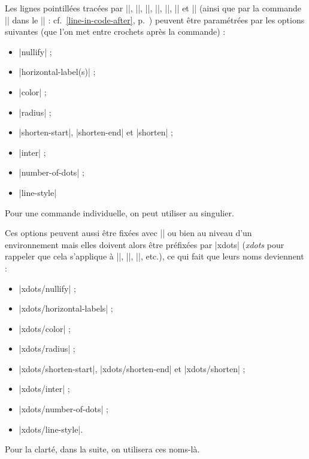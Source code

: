 \documentclass[dvipsnames]{article}
\begin{document}
\label{customization}


Les lignes pointillées tracées par |\Ldots|, |\Cdots|, |\Vdots|, |\Ddots|,
|\Iddots|, |\Hdotsfor| et |\Vdotsfor| (ainsi que par la commande |\line| dans le
|\CodeAfter| : cf.~\ref{line-in-code-after}, p.~\pageref{line-in-code-after})
peuvent être paramétrées par les options suivantes (que l'on met entre crochets
après la commande) :
%
\begin{itemize}[beginpenalty=10000]
\item |nullify| ;
\item |horizontal-label(s)| ;
\item |color| ;
\item |radius| ; 
\item |shorten-start|, |shorten-end| et |shorten| ;
\item |inter| ;
\item |number-of-dots| ;
\item |line-style|
\end{itemize}

\smallskip
Pour une commande individuelle, on peut utiliser 
au singulier.

\smallskip
Ces options peuvent aussi être fixées avec |\NiceMatrixOptions| ou bien au
niveau d'un environnement mais elles doivent alors être préfixées par |xdots|
(\textsl{xdots} pour rappeler que cela s'applique à |\Cdots|, |\Ldots|,
|\Vdots|, etc.), ce qui fait que leurs noms deviennent :
%
\begin{itemize}[beginpenalty=10000]
\item |xdots/nullify| ; 
\item |xdots/horizontal-labels| ;
\item |xdots/color| ;
\item |xdots/radius| ;
\item |xdots/shorten-start|, |xdots/shorten-end| et |xdots/shorten| ;
\item |xdots/inter| ;
\item |xdots/number-of-dots| ;
\item |xdots/line-style|.
\end{itemize}
%
Pour la clarté, dans la suite, on utilisera ces noms-là.
\end{document}

